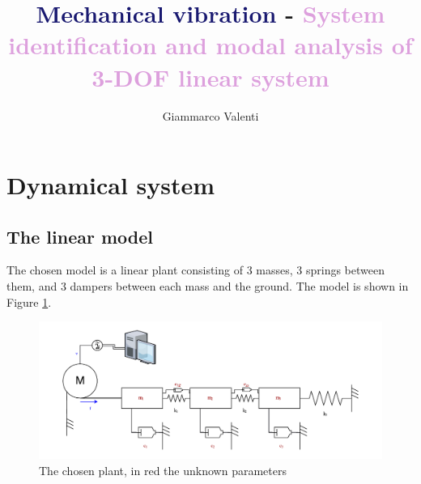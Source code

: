 \documentclass[twosided,a4paper]{article}           %
\begin{document}
	
	\title{\textcolor{MidnightBlue}{Mechanical vibration} - \textcolor{Plum}{System identification and modal analysis of 3-DOF linear system}}
	\author{Giammarco Valenti}
	\maketitle
	
\section{Dynamical system}

\subsection{The linear model}
The chosen model is a linear plant consisting of 3 masses, 3 springs between them, and 3 dampers between each mass and the ground. The model is shown in Figure \ref{fig:theplant1}.
\begin{figure}[H]
	\centering
	\includegraphics[width=\linewidth]{img/theplant1}
	\caption[The linear plant]{The chosen plant, in red the unknown parameters}
	\label{fig:theplant1}
\end{figure} %
\end{document}
